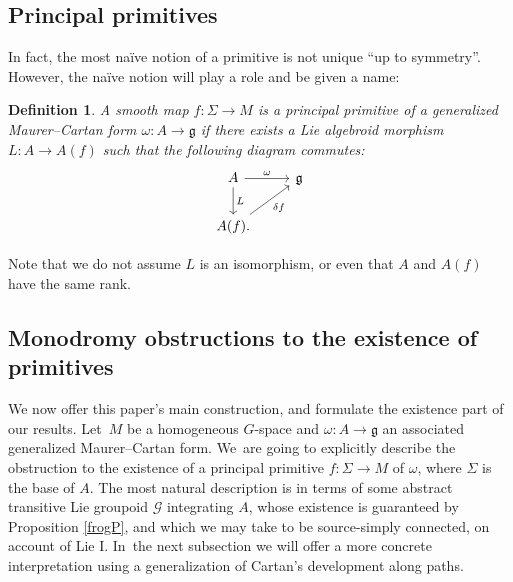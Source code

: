 \documentclass[10pt,a4paper]{amsart}
\numberwithin{equation}{section}
\newtheorem{Definition}[Theorem]{Definition}
\begin{document}
\subsection*{Principal primitives}

In fact, the most na\"ive notion of a primitive is not unique ``up to
symmetry''. However, the na\"ive notion will play a role and be given a
name:
\begin{Definition}
 A smooth map $f \colon \Sigma \rightarrow M$ is a {\it principal
 primitive} of a generalized Maurer--Cartan form
 $\omega \colon A \rightarrow {\mathfrak g} $ if there exists a Lie
 algebroid morphism $L \colon A \rightarrow A(f)$ such that the
 following diagram commutes:
 \begin{equation}
 \begin{tikzcd} A \arrow{d}{L} \arrow{r}{\omega } & {\mathfrak g}
 \\ A(f). \arrow[swap]{ru}{\delta f} &
 \end{tikzcd}
 \label{carpet:court}
 \end{equation}
\end{Definition}
 Note that we do not assume $L $ is an isomorphism, or even
that $A$ and $A(f)$ have the same rank.

\subsection*{Monodromy obstructions to the existence of
 primitives}

We now offer this paper's main construction, and formulate the
existence part of our results. Let~$M$ be a homogeneous $G$-space and
$\omega \colon A \rightarrow {\mathfrak g} $ an associated generalized
Maurer--Cartan form. We~are going to explicitly describe the
obstruction to the existence of a principal primitive
$f \colon \Sigma \rightarrow M $ of $\omega $, where $\Sigma $ is the
base of $A$. The most natural description is in terms of some abstract
transitive Lie groupoid ${\mathcal G}$ integrating $A$, whose
existence is guaranteed by Proposition \ref{frogP}, and which we may
take to be source-simply connected, on account of Lie I. In~the next
subsection we will offer a more concrete interpretation using a
generalization of Cartan's development along paths.
\end{document}
